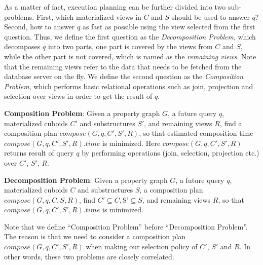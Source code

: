 As a matter of fact, execution planning can be further divided into two sub-problems. 
First, which materialized views in $C$ and $S$ should be used to answer $q$? Second, how to answer $q$ as fast as possible using the view selected from the first question. Thus, we define the first question as the \emph{Decomposition Problem}, which decomposes $q$ into two parts, one part is covered by the views from $C$ and $S$, while the other part is not covered, which is named as the \emph{remaining views}. Note that the remaining views refer to the data that needs to be fetched from the database server on the fly. We  define the second question as the \emph{Composition Problem}, which performs basic relational operations such as join, projection and selection over views in order to get the result of $q$. 

\noindent\textbf{Composition Problem}:
Given a property graph $G$, a future query $q$, materialized cuboids $C'$ and substructures $S'$, and remaining views $R$, find a composition plan $compose(G, q, C', S', R)$, so that estimated composition time $compose(G, q, C', S', R).time$ is minimized. Here $compose(G, q, C', S', R)$ returns result of query $q$ by performing operations (join, selection, projection etc.) over $C'$, $S'$, $R$.


\noindent\textbf{Decomposition Problem}:
Given a property graph $G$, a future query $q$, materialized cuboids $C$ and substructures $S$, a composition plan $compose(G, q, C, S, R)$, find $C' \subseteq C, $S'$\subseteq S$, and remaining views $R$, so that $compose(G, q, C', S', R).time$ is minimized. 

Note that we define ``Composition Problem'' before ``Decomposition Problem''. The reason is that we need to consider a composition plan $compose(G, q, C', S', R)$ when making our selection policy of $C'$, $S'$ and $R$. In other words, these two problems are closely correlated.  

